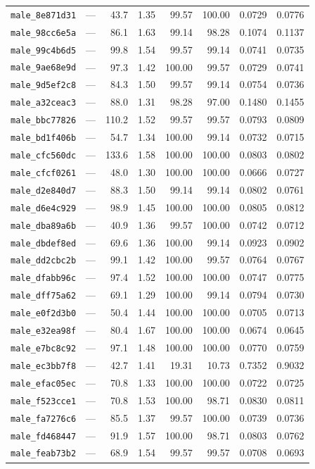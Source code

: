 \documentclass[11pt]{article}
\begin{document}
\begin{longtable}{lrrrrrrr}
\texttt{male\_8e871d31} & --- & 43.7 & 1.35 & 99.57 & 100.00 & 0.0729 & 0.0776 \\
\texttt{male\_98cc6e5a} & --- & 86.1 & 1.63 & 99.14 & 98.28 & 0.1074 & 0.1137 \\
\texttt{male\_99c4b6d5} & --- & 99.8 & 1.54 & 99.57 & 99.14 & 0.0741 & 0.0735 \\
\texttt{male\_9ae68e9d} & --- & 97.3 & 1.42 & 100.00 & 99.57 & 0.0729 & 0.0741 \\
\texttt{male\_9d5ef2c8} & --- & 84.3 & 1.50 & 99.57 & 99.14 & 0.0754 & 0.0736 \\
\texttt{male\_a32ceac3} & --- & 88.0 & 1.31 & 98.28 & 97.00 & 0.1480 & 0.1455 \\
\texttt{male\_bbc77826} & --- & 110.2 & 1.52 & 99.57 & 99.57 & 0.0793 & 0.0809 \\
\texttt{male\_bd1f406b} & --- & 54.7 & 1.34 & 100.00 & 99.14 & 0.0732 & 0.0715 \\
\texttt{male\_cfc560dc} & --- & 133.6 & 1.58 & 100.00 & 100.00 & 0.0803 & 0.0802 \\
\texttt{male\_cfcf0261} & --- & 48.0 & 1.30 & 100.00 & 100.00 & 0.0666 & 0.0727 \\
\texttt{male\_d2e840d7} & --- & 88.3 & 1.50 & 99.14 & 99.14 & 0.0802 & 0.0761 \\
\texttt{male\_d6e4c929} & --- & 98.9 & 1.45 & 100.00 & 100.00 & 0.0805 & 0.0812 \\
\texttt{male\_dba89a6b} & --- & 40.9 & 1.36 & 99.57 & 100.00 & 0.0742 & 0.0712 \\
\texttt{male\_dbdef8ed} & --- & 69.6 & 1.36 & 100.00 & 99.14 & 0.0923 & 0.0902 \\
\texttt{male\_dd2cbc2b} & --- & 99.1 & 1.42 & 100.00 & 99.57 & 0.0764 & 0.0767 \\
\texttt{male\_dfabb96c} & --- & 97.4 & 1.52 & 100.00 & 100.00 & 0.0747 & 0.0775 \\
\texttt{male\_dff75a62} & --- & 69.1 & 1.29 & 100.00 & 99.14 & 0.0794 & 0.0730 \\
\texttt{male\_e0f2d3b0} & --- & 50.4 & 1.44 & 100.00 & 100.00 & 0.0705 & 0.0713 \\
\texttt{male\_e32ea98f} & --- & 80.4 & 1.67 & 100.00 & 100.00 & 0.0674 & 0.0645 \\
\texttt{male\_e7bc8c92} & --- & 97.1 & 1.48 & 100.00 & 100.00 & 0.0770 & 0.0759 \\
\texttt{male\_ec3bb7f8} & --- & 42.7 & 1.41 & 19.31 & 10.73 & 0.7352 & 0.9032 \\
\texttt{male\_efac05ec} & --- & 70.8 & 1.33 & 100.00 & 100.00 & 0.0722 & 0.0725 \\
\texttt{male\_f523cce1} & --- & 70.8 & 1.53 & 100.00 & 98.71 & 0.0830 & 0.0811 \\
\texttt{male\_fa7276c6} & --- & 85.5 & 1.37 & 99.57 & 100.00 & 0.0739 & 0.0736 \\
\texttt{male\_fd468447} & --- & 91.9 & 1.57 & 100.00 & 98.71 & 0.0803 & 0.0762 \\
\texttt{male\_feab73b2} & --- & 68.9 & 1.54 & 99.57 & 99.57 & 0.0708 & 0.0693 \\
\end{longtable}\endgroup
\end{document}
